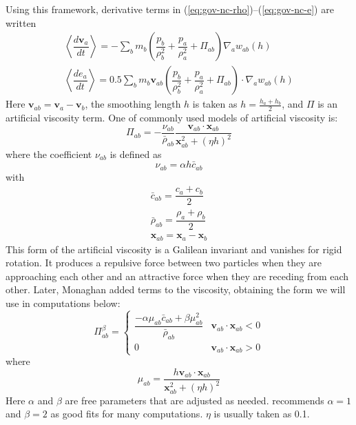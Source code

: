 \documentclass[review]{elsarticle}
\begin{document}
Using this framework, derivative terms in (\ref{eq:gov-nc-rho})--(\ref{eq:gov-nc-e}) are written 
\begin{align}
\left\langle\dfrac{d \textbf{v}_a}{d t}\right\rangle = -\sum_b m_b \left(\dfrac{p_b}{\rho_b^2} + \dfrac{p_a}{\rho_a^2} + \Pi_{ab}\right) \nabla_a w_{a b}\left(h\right) \label{eq:ns-sph-v} \\
\left\langle\dfrac{d e_a}{d t}\right\rangle=
 0.5\sum_b m_b \textbf{v}_{a b}\left(\dfrac{p_b}{\rho_b^2} + \dfrac{p_a}{\rho_a^2} + \Pi_{ab}\right) \cdot \nabla_a w_{a b}\left(h\right) \label{eq:ns-sph-e}
\end{align}
Here $\textbf{v}_{a b} = \textbf{v}_a - \textbf{v}_b$, the smoothing length $h$ is taken as $h=\frac{h_a + h_b}{2}$, and $\Pi$ is an artificial viscosity term.
One of commonly used models of artificial viscosity \citep{monaghan1983shock} is:
\begin{equation}
\Pi_{ab}=- \frac{\nu_{ab}}{\bar{\rho}_{ab}} \dfrac{ \textbf{v}_{ab} \cdot \textbf{x}_{ab}}{\textbf{x}_{ab}^2 + \left(\eta h\right)^2}
\label{eq:art-vis-original}
\end{equation}
where the coefficient $\nu_{ab}$ is defined as
\begin{equation}
\nu_{ab} = \alpha h \bar{c}_{ab}
\end{equation}
with
\begin{align}
\bar{c}_{ab} = \dfrac{c_a + c_b}{2} \\
\bar{\rho}_{ab} = \dfrac{\rho_a + \rho_b}{2} \\
\textbf{x}_{ab}=\textbf{x}_a-\textbf{x}_b
\end{align}
This form of the artificial viscosity is a Galilean invariant and vanishes for rigid rotation. It produces a repulsive force between two particles when they are approaching each other and an attractive force when they are receding from each other.
Later, Monaghan\citep{monaghan1992smoothed} added terms to the viscosity, obtaining the form we will use in computations below:
\begin{equation}
\Pi_{ab}^{\beta} = 
\begin{cases} 
      \dfrac{- \alpha \mu_{ab} \bar{c}_{ab} + \beta \mu_{ab}^2} {\bar{\rho}_{ab}} & \textbf{v}_{ab} \cdot \textbf{x}_{ab} < 0\\
      0 & \textbf{v}_{ab} \cdot \textbf{x}_{ab} > 0
\end{cases}
\label{eq:art-vis-shock}
\end{equation}
where
\begin{equation}
\mu_{ab} = \dfrac{h \textbf{v}_{ab} \cdot \textbf{x}_{ab}}{\textbf{x}_{ab}^2 + \left(\eta h\right)^2} 
\end{equation}
Here $\alpha$ and $\beta$ are free parameters that are adjusted as needed. \citet{monaghan2005smoothed} recommends $\alpha = 1$ and $\beta = 2$ as good fits for many computations. $\eta$ is usually taken as 0.1.
\end{document}
